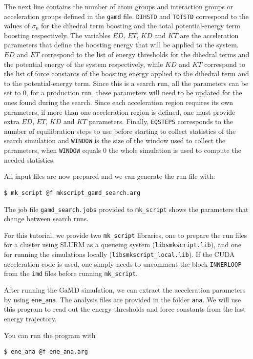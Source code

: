 The next line contains the number of atom groups and interaction groups or acceleration groups defined in the \texttt{gamd} file.
\texttt{DIHSTD} and \texttt{TOTSTD} correspond to the values of $\sigma_0$ for the dihedral term boosting and the total potential-energy term boosting respectively.  
The variables $ED$, $ET$, $KD$ and $KT$ are the acceleration parameters that define the boosting energy that will be applied to the system. $ED$ and $ET$ correspond to the list of energy thresholds for the dihedral terms and the potential energy of the system respectively, while $KD$ and $KT$ correspond to the list of force constants of the boosting energy applied to the dihedral term and to the potential-energy term. Since this is a search run, all the parameters can be set to 0, for a production run, these parameters will need to be updated for the ones found during the search. Since each acceleration region requires its own parameters, if more than one acceleration region is defined, one must provide extra $ED$, $ET$, $KD$ and $KT$ parameters.
Finally, \texttt{EQSTEPS}  corresponds to the number of equilibration steps to use before starting to collect statistics of the search simulation and \texttt{WINDOW} is the size of the window used to collect the parameters, when \texttt{WINDOW} equals 0 the whole simulation is used to compute the needed statistics.

All input files are now prepared and we can generate the run file with:
\begin{lstlisting}
$ mk_script @f mkscript_gamd_search.arg
\end{lstlisting}
The job file \texttt{gamd\_search.jobs} provided to \texttt{mk\_script} shows the parameters that change between search runs.

For this tutorial, we provide two \texttt{mk\_script} libraries, one to prepare the run files for a cluster using SLURM as a queueing system (\texttt{libs\/mkscript.lib}), and one for running the simulations locally (\texttt{libs\/mkscript\_local.lib}). If the CUDA acceleration code is used, one simply needs to uncomment the block \texttt{INNERLOOP} from the \texttt{imd} files before running \texttt{mk\_script}.

After running the GaMD simulation, we can extract the acceleration parameters by using \texttt{ene\_ana}. The analysis files are provided in the folder \texttt{ana}.
We will use this program to read out the energy thresholds and force constants from the last energy trajectory.

You can run the program with 
\begin{lstlisting}
$ ene_ana @f ene_ana.arg
\end{lstlisting}

